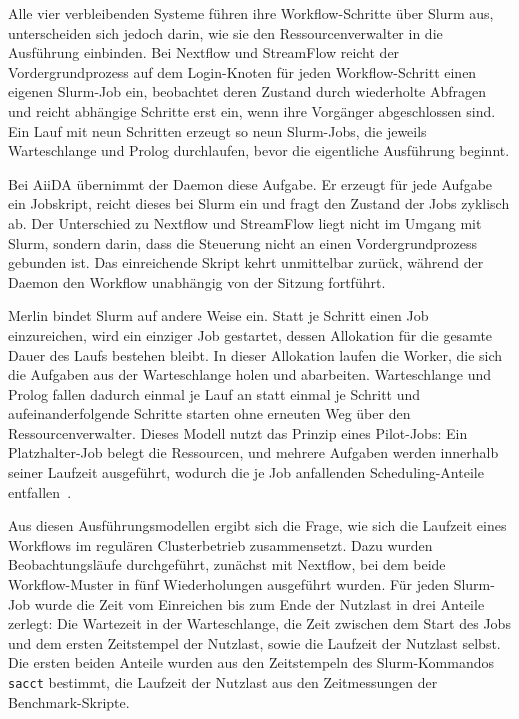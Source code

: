 Alle vier verbleibenden Systeme führen ihre Workflow-Schritte über
Slurm aus, unterscheiden sich jedoch darin, wie sie den
Ressourcenverwalter in die Ausführung einbinden. Bei Nextflow und
StreamFlow reicht der Vordergrundprozess auf dem Login-Knoten für
jeden Workflow-Schritt einen eigenen Slurm-Job ein, beobachtet deren Zustand durch wiederholte Abfragen und reicht abhängige
Schritte erst ein, wenn ihre Vorgänger abgeschlossen sind. Ein Lauf
mit neun Schritten erzeugt so neun Slurm-Jobs, die
jeweils Warteschlange und Prolog durchlaufen, bevor die eigentliche
Ausführung beginnt.

Bei AiiDA übernimmt der Daemon diese Aufgabe. Er erzeugt für jede
Aufgabe ein Jobskript, reicht dieses bei Slurm ein und fragt den
Zustand der Jobs zyklisch ab. Der Unterschied zu Nextflow und
StreamFlow liegt nicht im Umgang mit Slurm, sondern darin, dass die
Steuerung nicht an einen Vordergrundprozess gebunden ist. Das
einreichende Skript kehrt unmittelbar zurück, während der Daemon
den Workflow unabhängig von der Sitzung fortführt.

Merlin bindet Slurm auf andere Weise ein. Statt je Schritt einen
Job einzureichen, wird ein einziger Job gestartet, dessen
Allokation für die gesamte Dauer des Laufs bestehen bleibt. In dieser Allokation laufen die Worker, die sich die Aufgaben aus der Warteschlange
holen und abarbeiten. Warteschlange und Prolog fallen dadurch
einmal je Lauf an statt einmal je Schritt und aufeinanderfolgende Schritte starten ohne erneuten Weg über den
Ressourcenverwalter. Dieses Modell nutzt das Prinzip eines Pilot-Jobs: Ein Platzhalter-Job belegt die Ressourcen, und mehrere Aufgaben werden innerhalb seiner Laufzeit ausgeführt, wodurch die je Job anfallenden Scheduling-Anteile entfallen~\cite[S.~18]{chen2011overhead}.

Aus diesen Ausführungsmodellen ergibt sich die Frage, wie sich die
Laufzeit eines Workflows im regulären Clusterbetrieb
zusammensetzt. Dazu wurden Beobachtungsläufe durchgeführt, zunächst
mit Nextflow, bei dem beide Workflow-Muster in fünf Wiederholungen
ausgeführt wurden. Für jeden Slurm-Job wurde die Zeit vom
Einreichen bis zum Ende der Nutzlast in drei Anteile zerlegt: Die
Wartezeit in der Warteschlange, die Zeit zwischen dem Start des
Jobs und dem ersten Zeitstempel der Nutzlast, sowie die Laufzeit
der Nutzlast selbst. Die ersten beiden Anteile wurden aus den
Zeitstempeln des Slurm-Kommandos \texttt{sacct} bestimmt, die Laufzeit der Nutzlast
aus den Zeitmessungen der Benchmark-Skripte.

